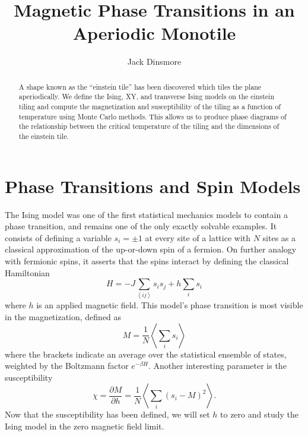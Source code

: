 \documentclass[amsmath,amssymb,aps,twocolumn,nofootinbib]{revtex4-2}
\newcommand{\braket}[1]{\left \langle #1 \right \rangle}
\begin{document}
\title{Magnetic Phase Transitions in an Aperiodic Monotile}
\author{Jack Dinsmore}

\begin{abstract}
  A shape known as the ``einstein tile'' has been discovered which tiles the plane aperiodically. We define the Ising, XY, and transverse Ising models on the einstein tiling and compute the magnetization and susceptibility of the tiling as a function of temperature using Monte Carlo methods. This allows us to produce phase diagrams of the relationship between the critical temperature of the tiling and the dimensions of the einstein tile.
\end{abstract}

\maketitle

\section{Phase Transitions and Spin Models}
The Ising model was one of the first statistical mechanics models to contain a phase transition, and remains one of the only exactly solvable examples. It consists of defining a variable $s_i = \pm 1$ at every site of a lattice with $N$ sites as a classical approximation of the up-or-down spin of a fermion. On further analogy with fermionic spins, it asserts that the spins interact by defining the classical Hamiltonian
\begin{equation}
  H = -J \sum_{\braket{ij}} s_i s_j + h \sum_i s_i
  \label{eqn:ising}
\end{equation}
where $h$ is an applied magnetic field. This model's phase transition is most visible in the magnetization, defined as
\begin{equation}
  M = \frac{1}{N}\braket{\sum_{i} s_i}
  \label{eqn:magnetization}
\end{equation}
where the brackets indicate an average over the statistical ensemble of states, weighted by the Boltzmann factor $e^{-\beta H}$. Another interesting parameter is the susceptibility
\begin{equation}
  \chi = \frac{\partial M}{\partial h} = \frac{1}{N} \braket{\sum_{i} (s_i - M)^2}.
\end{equation}
Now that the susceptibility has been defined, we will set $h$ to zero and study the Ising model in the zero magnetic field limit.
\end{document}
